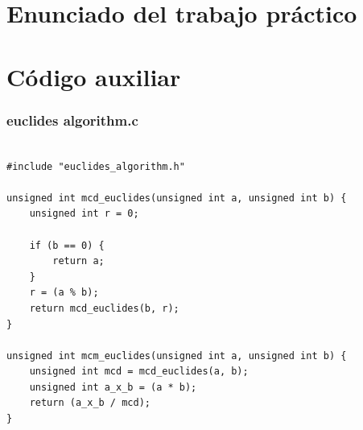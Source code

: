 \documentclass[titlepage,a4paper]{article}
\begin{document}
\section{Enunciado del trabajo práctico}
% 

\newpage
\section{Código auxiliar}

\subsubsection{euclides algorithm.c}
\begin{lstlisting}[style=customC]

#include "euclides_algorithm.h"

unsigned int mcd_euclides(unsigned int a, unsigned int b) {
	unsigned int r = 0;
	
	if (b == 0) {
		return a;
	}
	r = (a % b);
	return mcd_euclides(b, r);
}

unsigned int mcm_euclides(unsigned int a, unsigned int b) {
	unsigned int mcd = mcd_euclides(a, b);
	unsigned int a_x_b = (a * b);
	return (a_x_b / mcd);
}

\end{lstlisting}
\end{document}
